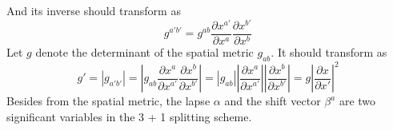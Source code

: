 \documentclass[letterpaper,nofootinbib,prd,amsmath,onecolumn]{revtex4-1}
\begin{document}
And its inverse should transform as
\begin{equation}
g^{a'b'} = g^{ab}\frac{\partial x^{a'}}{\partial x^{a}}\frac{\partial x^{b'}}{\partial x^{b}}\label{spatial metric}
\end{equation}
Let $g$ denote the determinant of the spatial metric $g_{ab}$. It should transform as
\begin{equation}
g' = |g_{a'b'}| = |g_{ab}\frac{\partial x^{a}}{\partial x^{a'}}\frac{\partial x^{b}}{\partial x^{b'}}| = |g_{ab}||\frac{\partial x^{a}}{\partial x^{a'}}||\frac{\partial x^{b}}{\partial x^{b'}}| = g|\frac{\partial x}{\partial x'}|^{2}
\end{equation}
Besides from the spatial metric, the lapse $\alpha$ and the shift vector $\beta^{a}$ are two significant variables in the 3 + 1 splitting scheme. 
\end{document}
